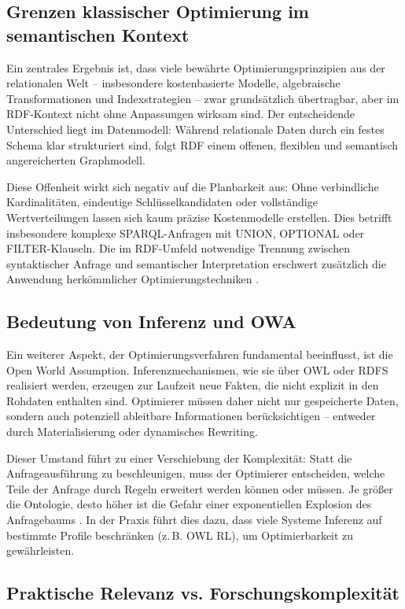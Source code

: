 \documentclass[12pt]{article}
\begin{document}
\subsection{Grenzen klassischer Optimierung im semantischen Kontext}

Ein zentrales Ergebnis ist, dass viele bewährte Optimierungsprinzipien aus der relationalen Welt – insbesondere kostenbasierte Modelle, algebraische Transformationen und Indexstrategien – zwar grundsätzlich übertragbar, aber im RDF-Kontext nicht ohne Anpassungen wirksam sind. Der entscheidende Unterschied liegt im Datenmodell: Während relationale Daten durch ein festes Schema klar strukturiert sind, folgt RDF einem offenen, flexiblen und semantisch angereicherten Graphmodell.

Diese Offenheit wirkt sich negativ auf die Planbarkeit aus: Ohne verbindliche Kardinalitäten, eindeutige Schlüsselkandidaten oder vollständige Wertverteilungen lassen sich kaum präzise Kostenmodelle erstellen. Dies betrifft insbesondere komplexe SPARQL-Anfragen mit UNION, OPTIONAL oder FILTER-Klauseln. Die im RDF-Umfeld notwendige Trennung zwischen syntaktischer Anfrage und semantischer Interpretation erschwert zusätzlich die Anwendung herkömmlicher Optimierungstechniken \cite{nourie2021survey}.

\subsection{Bedeutung von Inferenz und OWA}

Ein weiterer Aspekt, der Optimierungsverfahren fundamental beeinflusst, ist die Open World Assumption. Inferenzmechanismen, wie sie über OWL oder RDFS realisiert werden, erzeugen zur Laufzeit neue Fakten, die nicht explizit in den Rohdaten enthalten sind. Optimierer müssen daher nicht nur gespeicherte Daten, sondern auch potenziell ableitbare Informationen berücksichtigen – entweder durch Materialisierung oder dynamisches Rewriting.

Dieser Umstand führt zu einer Verschiebung der Komplexität: Statt die Anfrageausführung zu beschleunigen, muss der Optimierer entscheiden, welche Teile der Anfrage durch Regeln erweitert werden können oder müssen. Je größer die Ontologie, desto höher ist die Gefahr einer exponentiellen Explosion des Anfragebaums \cite{tsatsanifos2012ontologies}. In der Praxis führt dies dazu, dass viele Systeme Inferenz auf bestimmte Profile beschränken (z.\,B. OWL RL), um Optimierbarkeit zu gewährleisten.

\subsection{Praktische Relevanz vs. Forschungskomplexität}
\end{document}
